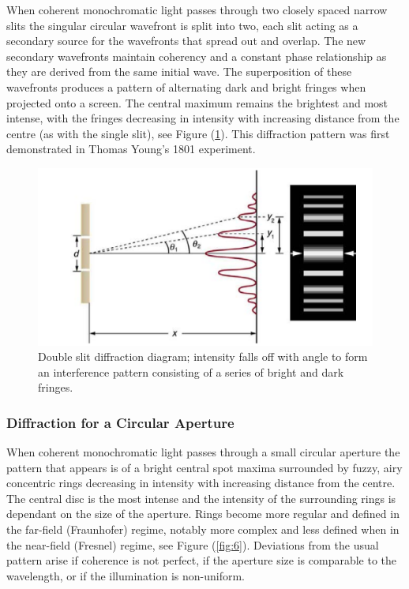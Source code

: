 \documentclass[12pt]{article}
\begin{document}
When coherent monochromatic light passes through two closely spaced narrow slits the singular circular wavefront is split into two, each slit acting as a secondary source for the wavefronts that spread out and overlap.
The new secondary wavefronts maintain coherency and a constant phase relationship as they are derived from the same initial wave. The superposition of these wavefronts produces a pattern of alternating dark and bright fringes
when projected onto a screen. The central maximum remains the brightest and most intense, with the fringes decreasing in intensity with increasing distance from the centre (as with the single slit), see Figure (\ref{fig:5}). This diffraction pattern was first demonstrated in
Thomas Young's 1801 experiment. \cite{hecht2012optics,openstax3,10.11648/j.ajop.20190701.11}

\begin{figure}[H]
    \centering
    \includegraphics[width=.5\textwidth]{youngs slit.png}
    \caption{Double slit diffraction diagram; intensity falls off with angle to form an interference pattern consisting of a series of bright and dark fringes. \cite{openstax3}}
    \label{fig:5}
\end{figure}

\subsubsection{Diffraction for a Circular Aperture} \label{sec:2.3.4}

When coherent monochromatic light passes through a small circular aperture the pattern that appears is of a bright central spot maxima surrounded by fuzzy, airy concentric rings
decreasing in intensity with increasing distance from the centre. The central disc is the most intense and the intensity of the surrounding rings is dependant on the size of the aperture.
Rings become more regular and defined in the far-field (Fraunhofer) regime, notably more complex and less defined when in the near-field (Fresnel) regime, see Figure (\ref{fig:6}). Deviations from the usual pattern arise 
if coherence is not perfect, if the aperture size is comparable to the wavelength, or if the illumination is non-uniform. \cite{openstax3,andrews1947diffraction,burch1985fresnel,koushki2019diffraction}
\end{document}
